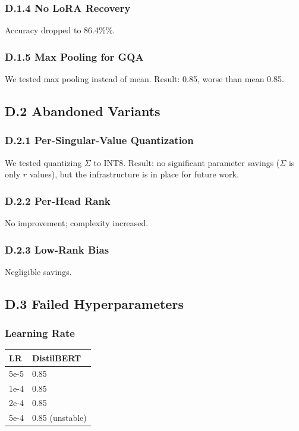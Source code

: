 \subsubsection{D.1.4 No LoRA Recovery}

Accuracy dropped to 86.4\%\%.

\subsubsection{D.1.5 Max Pooling for GQA}

We tested max pooling instead of mean. Result: 0.85, worse than mean 
0.85.

\subsection{D.2 Abandoned Variants}

\subsubsection{D.2.1 Per-Singular-Value Quantization}

We tested quantizing $\Sigma$ to INT8. Result: no significant parameter 
savings ($\Sigma$ is only $r$ values), but the infrastructure is in place for 
future work.

\subsubsection{D.2.2 Per-Head Rank}

No improvement; complexity increased.

\subsubsection{D.2.3 Low-Rank Bias}

Negligible savings.

\subsection{D.3 Failed Hyperparameters}

\subsubsection{Learning Rate}

\begin{table}[H]
\centering
\small
\begin{tabular}{ll}
\toprule
\textbf{LR} & \textbf{DistilBERT} \\
\midrule
5e-5 & 0.85 \\
1e-4 & 0.85 \\
2e-4 & 0.85 \\
5e-4 & 0.85 (unstable) \\
\bottomrule
\end{tabular}
\end{table}

